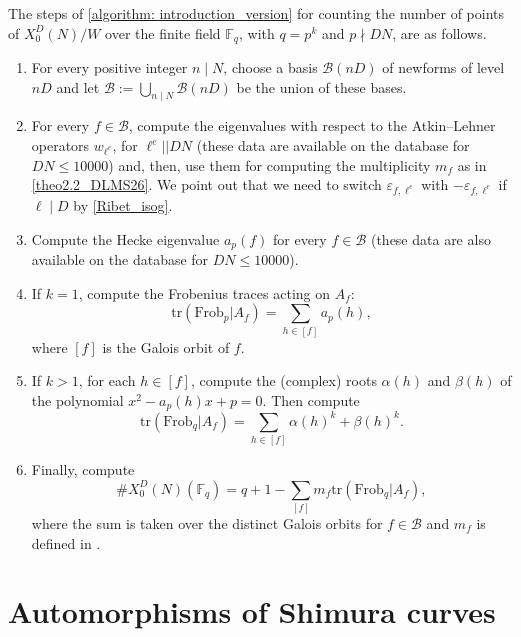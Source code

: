 \documentclass[11pt,reqno]{amsart}
\newcommand{\F}{\mathbb{F}}
\theoremstyle{definition}
\begin{document}
The steps of \cref{algorithm: introduction_version} for counting the number of points of $X_0^D(N)/W$ over the finite field $\F_q$, with $q=p^k$ and $p\nmid DN$, are as follows.
\begin{enumerate}
    \item For every positive integer $n\mid N$, choose a basis $\mathcal B(nD)$ of newforms of level $nD$ and let $\mathcal B:=\bigcup_{n\mid N} \mathcal B(nD)$ be the union of these bases.
    \item For every $f \in\mathcal B$, compute the eigenvalues with respect to the Atkin--Lehner operators $w_{\ell^e}$, for $\ell^e||DN$ (these data are available on the database \cite{LMFDB} for $DN\leq 10000$) and, then, use them for computing the multiplicity $m_f$ as in \cref{theo2.2_DLMS26}. We point out that we need to switch $\varepsilon_{f,\ell^e}$ with $-\varepsilon_{f,\ell^e}$ if $\ell\mid D$ by \cref{Ribet_isog}.
    \item Compute the Hecke eigenvalue $a_p(f)$ for every $f\in\mathcal B$ (these data are also available on the database \cite{LMFDB} for $DN\leq 10000$).
    \item If $k=1$, compute the Frobenius traces acting on $A_f$: 
    \[
    \mathrm{tr}(\mathrm{Frob}_p|A_f)=\sum_{h\in [f]} a_p(h),
    \]
    where $[f]$ is the Galois orbit of $f$.
    \item If $k>1$, for each $h\in [f]$, compute the (complex) roots $\alpha(h)$ and $\beta(h)$ of the polynomial $x^2-a_p(h)x+p=0$. Then compute
    \[
    \mathrm{tr}(\mathrm{Frob}_q|A_f)=\sum_{h\in [f]}\alpha(h)^k+\beta(h)^k.
    \]
    \item Finally, compute
    \[
    \#X_0^D(N)(\F_q)=q+1-\sum_{[f]} m_f \mathrm{tr}(\mathrm{Frob}_q|A_f),
    \]
    where the sum is taken over the distinct Galois orbits for $f\in \mathcal{B}$ and $m_f$ is defined in .
\end{enumerate}






\section{Automorphisms of Shimura curves}\label{section: automorphisms}
\end{document}
